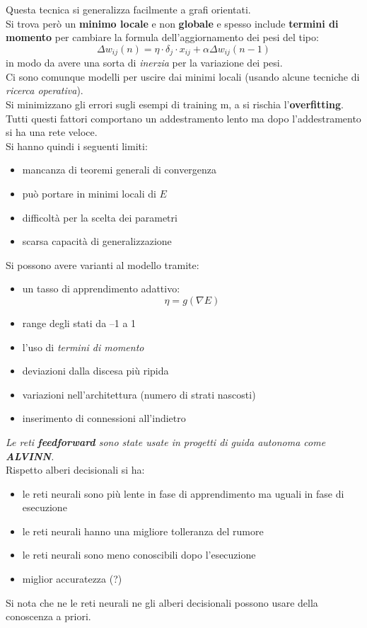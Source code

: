 							Questa tecnica si generalizza facilmente a grafi orientati.\\  
							Si trova però un \textbf{minimo locale} e non \textbf{globale} e spesso
							include \textbf{termini di momento} per cambiare la formula dell'aggiornamento
							dei pesi del tipo: 
							\[\Delta w_{ij}(n)=\eta\cdot \delta_j\cdot x_{ij}+\alpha\Delta w_{ij}(n-1)\]
							in modo da avere una sorta di \textit{inerzia} per la variazione dei pesi.\\
							Ci sono comunque modelli per uscire dai minimi locali (usando alcune tecniche di
							\textit{ricerca operativa}).\\
							Si minimizzano gli errori sugli esempi di training m, a si rischia
							l'\textbf{overfitting}.\\
							Tutti questi fattori comportano un addestramento lento ma dopo l'addestramento
							si ha una rete veloce.\\
							Si hanno quindi i seguenti limiti:
							\begin{itemize}
								\item mancanza di teoremi generali di convergenza
								\item può portare in minimi locali di $E$ 
								\item difficoltà per la scelta dei parametri 
								\item scarsa capacità di generalizzazione 
							\end{itemize}
							Si possono avere varianti al modello tramite:
							\begin{itemize}
								\item un tasso di apprendimento adattivo:
								      \[\eta=g(\nabla E)\]
								\item range degli stati da –1 a 1 
								\item l'uso di \textit{termini di momento}
								\item deviazioni dalla discesa più ripida 
								\item variazioni nell'architettura (numero di strati nascosti)
								\item inserimento di connessioni all'indietro
							\end{itemize}
							\textit{Le reti \textbf{feedforward} sono state usate in progetti di guida
								autonoma come \textbf{ALVINN}.}\\
							Rispetto alberi decisionali si ha:
							\begin{itemize}
								\item le reti neurali sono più lente in fase di apprendimento ma uguali in
								      fase di esecuzione
								\item le reti neurali hanno una migliore tolleranza del rumore
								\item le reti neurali sono meno conoscibili dopo l'esecuzione
								\item miglior accuratezza (?)
							\end{itemize}
							Si nota che ne le reti neurali ne gli alberi decisionali possono usare della
							conoscenza a priori.
